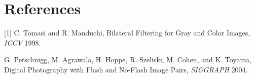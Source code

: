 \documentclass{article}
\begin{document}
\section{References}
\small{
[1] C. Tomasi and R. Manduchi, Bilateral Filtering for Gray and Color Images, \textit{ICCV} 1998.

\noindent [2] G. Petschnigg, M. Agrawala, H. Hoppe, R. Szeliski, M. Cohen, and K. Toyama, Digital Photography with Flash and No-Flash Image Pairs, \textit{SIGGRAPH} 2004.
}
\end{document}
